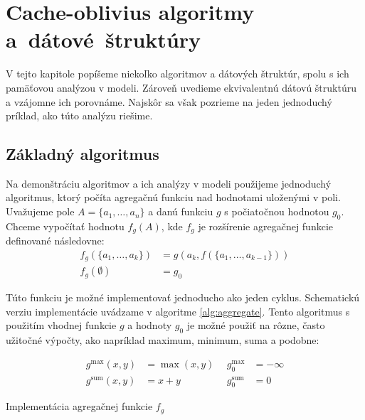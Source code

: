 \chapter{Cache-oblivius algoritmy a~dátové~štruktúry}

V tejto kapitole popíšeme niekoľko \obliv algoritmov a dátových štruktúr, spolu s ich pamäťovou analýzou v \obliv modeli. Zároveň uvedieme ekvivalentnú \aware dátovú štruktúru a vzájomne ich porovnáme. Najskôr sa však pozrieme na jeden jednoduchý príklad, ako túto analýzu riešime.

\section{Základný algoritmus}

Na demonštráciu \obliv algoritmov a ich analýzy v \extmem modeli použijeme jednoduchý algoritmus, ktorý počíta agregačnú funkciu nad hodnotami uloženými v poli. Uvažujeme pole $A = \{a_1,\dotsc,a_n\}$ a danú funkciu $g$ s počiatočnou hodnotou $g_0$. Chceme vypočítať hodnotu $f_g(A)$, kde $f_g$ je rozšírenie agregačnej funkcie definované následovne:
\[
\begin{aligned}
f_g(\{a_1,\dotsc,a_k\}) &= g(a_k, f(\{a_1,\dotsc,a_{k-1}\})) \\
f_g(\emptyset) &= g_0
\end{aligned}
\]

Túto funkciu je možné implementovať jednoducho ako jeden cyklus. Schematickú verziu implementácie uvádzame v algoritme \ref{alg:aggregate}. Tento algoritmus s použitím vhodnej funkcie $g$ a hodnoty $g_0$ je možné použiť na rôzne, často užitočné výpočty, ako napríklad maximum, minimum, suma a podobne:

\[
\begin{aligned}
g^{\textrm{max}}(x, y) &= \max(x, y) ~~ &g^{\textrm{max}}_0 &= -\infty \\
g^{\textrm{sum}}(x,y) &= x+y &g^{\textrm{sum}}_0 &= 0
\end{aligned}
\]

\begin{algorithm}
    \caption{Implementácia agregačnej funkcie $f_g$}
    \label{alg:aggregate}
    \begin{algorithmic}[1]
            \EndFor
            \State {}
        \EndFunction
    \end{algorithmic}
\end{algorithm}


